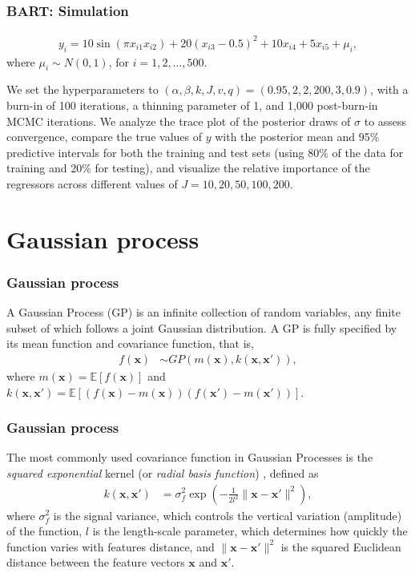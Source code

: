 \documentclass[12pt, compress]{beamer}
\begin{document}
\begin{frame}
	\frametitle{BART: Simulation}
\begin{align*}
	y_i = 10\sin(\pi x_{i1}x_{i2}) + 20(x_{i3}-0.5)^2 + 10 x_{i4} + 5 x_{i5} + \mu_i,
\end{align*}
where \( \mu_i \sim N(0,1) \), for \( i = 1, 2, \dots, 500 \).

We set the hyperparameters to \( (\alpha, \beta, k, J, v, q) = (0.95, 2, 2, 200, 3, 0.9) \), with a burn-in of 100 iterations, a thinning parameter of 1, and 1,000 post-burn-in MCMC iterations. We analyze the trace plot of the posterior draws of \( \sigma \) to assess convergence, compare the true values of \( y \) with the posterior mean and 95\% predictive intervals for both the training and test sets (using 80\% of the data for training and 20\% for testing), and visualize the relative importance of the regressors across different values of \( J = 10, 20, 50, 100, 200 \).

\end{frame}

\section{Gaussian process}
\begin{frame}
	\frametitle{Gaussian process}
A Gaussian Process (GP) is an infinite collection of random variables, any finite subset of which follows a joint Gaussian distribution. A GP is fully specified by its mean function and covariance function, that is,
\begin{align*}
	f(\mathbf{x}) &\sim GP(m(\mathbf{x}), k(\mathbf{x}, \mathbf{x}')),
\end{align*}
where \( m(\mathbf{x}) = \mathbb{E}[f(\mathbf{x})] \) and \( k(\mathbf{x}, \mathbf{x}') = \mathbb{E}[(f(\mathbf{x}) - m(\mathbf{x}))(f(\mathbf{x}') - m(\mathbf{x}'))] \). 

\end{frame}

\begin{frame}
	\frametitle{Gaussian process}
The most commonly used covariance function in Gaussian Processes is the \textit{squared exponential} kernel (or \textit{radial basis function}) \cite{jacobi2024posterior}, defined as
\begin{align*}
	k(\mathbf{x}, \mathbf{x}') & = \sigma^2_f \exp\left(-\frac{1}{2l^2} \|\mathbf{x} - \mathbf{x}'\|^2\right),
\end{align*}
where \( \sigma^2_f \) is the signal variance, which controls the vertical variation (amplitude) of the function, \( l \) is the length-scale parameter, which determines how quickly the function varies with features distance, and \( \|\mathbf{x} - \mathbf{x}'\|^2 \) is the squared Euclidean distance between the feature vectors \( \mathbf{x} \) and \( \mathbf{x}' \).
\end{frame}
\end{document}
